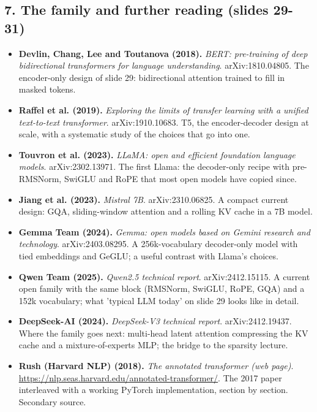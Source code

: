 \documentclass[11pt,letterpaper]{article}
\begin{document}
\subsection*{7. The family and further reading (slides 29-31)}
\begin{itemize}[leftmargin=1.2em,itemsep=3pt]\sloppy
\item \textbf{Devlin, Chang, Lee and Toutanova (2018).} \textit{BERT: pre-training of deep bidirectional transformers for language understanding}. arXiv:1810.04805. The encoder-only design of slide 29: bidirectional attention trained to fill in masked tokens.
\item \textbf{Raffel et al. (2019).} \textit{Exploring the limits of transfer learning with a unified text-to-text transformer}. arXiv:1910.10683. T5, the encoder-decoder design at scale, with a systematic study of the choices that go into one.
\item \textbf{Touvron et al. (2023).} \textit{LLaMA: open and efficient foundation language models}. arXiv:2302.13971. The first Llama: the decoder-only recipe with pre-RMSNorm, SwiGLU and RoPE that most open models have copied since.
\item \textbf{Jiang et al. (2023).} \textit{Mistral 7B}. arXiv:2310.06825. A compact current design: GQA, sliding-window attention and a rolling KV cache in a 7B model.
\item \textbf{Gemma Team (2024).} \textit{Gemma: open models based on Gemini research and technology}. arXiv:2403.08295. A 256k-vocabulary decoder-only model with tied embeddings and GeGLU; a useful contrast with Llama's choices.
\item \textbf{Qwen Team (2025).} \textit{Qwen2.5 technical report}. arXiv:2412.15115. A current open family with the same block (RMSNorm, SwiGLU, RoPE, GQA) and a 152k vocabulary; what 'typical LLM today' on slide 29 looks like in detail.
\item \textbf{DeepSeek-AI (2024).} \textit{DeepSeek-V3 technical report}. arXiv:2412.19437. Where the family goes next: multi-head latent attention compressing the KV cache and a mixture-of-experts MLP; the bridge to the sparsity lecture.
\item \textbf{Rush (Harvard NLP) (2018).} \textit{The annotated transformer (web page)}. \url{https://nlp.seas.harvard.edu/annotated-transformer/}. The 2017 paper interleaved with a working PyTorch implementation, section by section. Secondary source.
\end{itemize}
\clearpage
\printindex
\end{document}
